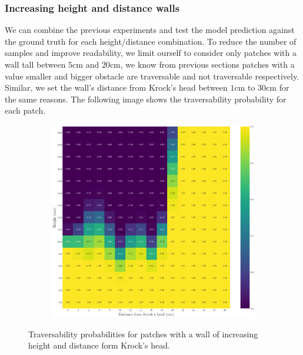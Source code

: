 \subsubsection{Increasing height and distance walls}
We can combine the previous experiments and test the model prediction against the ground truth for each height/distance combination. To reduce the number of samples and improve readability, we limit ourself to consider only patches with a wall tall between $5$cm and $20$cm, we know from previous sections patches with a value smaller and bigger obstacle are traversable and not traversable respectively. Similar, we set the wall's distance from Krock's head between $1$cm to $30$cm for the same reasons. The following image shows the traversability probability for each patch.
\begin{figure}[H]
    \centering
\begin{subfigure}[b]{1\textwidth}
    \includegraphics[width=\linewidth]{../img/5/custom_patches/walls_heights/walls_heights.png}
    \end{subfigure}
    \caption{Traversability probabilities for patches with a wall of increasing height and distance form Krock's head.}
\end{figure}



